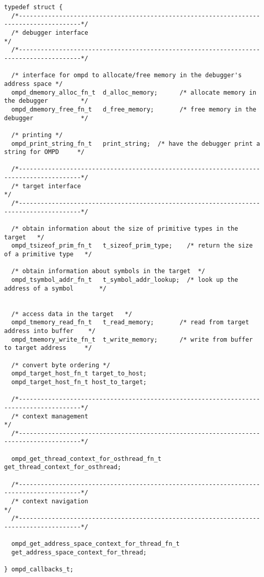 \begin{lstlisting}
typedef struct {
  /*---------------------------------------------------------------------------------------*/
  /* debugger interface                                                                    */
  /*---------------------------------------------------------------------------------------*/
  
  /* interface for ompd to allocate/free memory in the debugger's address space */
  ompd_dmemory_alloc_fn_t  d_alloc_memory;      /* allocate memory in the debugger         */
  ompd_dmemory_free_fn_t   d_free_memory;       /* free memory in the debugger             */

  /* printing */
  ompd_print_string_fn_t   print_string;  /* have the debugger print a string for OMPD     */
    
  /*---------------------------------------------------------------------------------------*/
  /* target interface                                                                      */
  /*---------------------------------------------------------------------------------------*/
  
  /* obtain information about the size of primitive types in the target   */
  ompd_tsizeof_prim_fn_t   t_sizeof_prim_type;    /* return the size of a primitive type   */
  
  /* obtain information about symbols in the target  */
  ompd_tsymbol_addr_fn_t   t_symbol_addr_lookup;  /* look up the address of a symbol       */
  
  
  /* access data in the target   */
  ompd_tmemory_read_fn_t   t_read_memory;       /* read from target address into buffer    */
  ompd_tmemory_write_fn_t  t_write_memory;      /* write from buffer to target address     */
  
  /* convert byte ordering */
  ompd_target_host_fn_t target_to_host; 
  ompd_target_host_fn_t host_to_target; 
  
  /*---------------------------------------------------------------------------------------*/
  /* context management                                                                    */
  /*---------------------------------------------------------------------------------------*/

  ompd_get_thread_context_for_osthread_fn_t get_thread_context_for_osthread;

  /*---------------------------------------------------------------------------------------*/
  /* context navigation                                                                    */
  /*---------------------------------------------------------------------------------------*/

  ompd_get_address_space_context_for_thread_fn_t  
  get_address_space_context_for_thread;

} ompd_callbacks_t;
\end{lstlisting}
